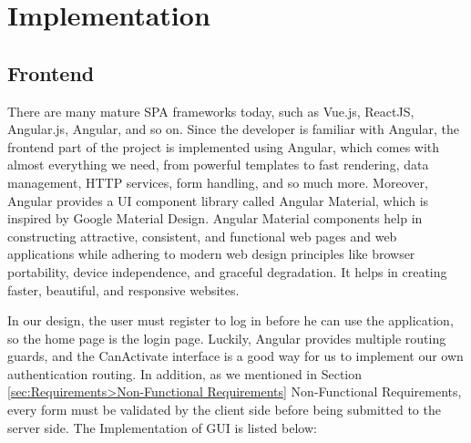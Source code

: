 \section{Implementation}
\label{sec:Implementation}

\subsection{Frontend}
There are many mature SPA frameworks today, such as Vue.js, ReactJS, Angular.js, Angular, and so on. Since the developer is familiar with Angular, the frontend part of the project is implemented using Angular, which comes with almost everything we need, from powerful templates to fast rendering, data management, HTTP services, form handling, and so much more. Moreover, Angular provides a UI component library called Angular Material,
which is inspired by Google Material Design. Angular Material components help in constructing attractive, consistent, and functional web pages and web applications while adhering to modern web design principles like browser portability, device independence, and graceful degradation. It helps in creating faster, beautiful, and responsive websites.

In our design, the user must register to log in before he can use the application, so the home page is the login page. Luckily, Angular provides multiple routing guards, and the CanActivate interface is a good way for us to implement our own authentication routing. In addition, as we mentioned in Section \ref{sec:Requirements>Non-Functional Requirements} Non-Functional Requirements, every form must be validated by the client side before being submitted to the server side. The Implementation of GUI is listed below:

